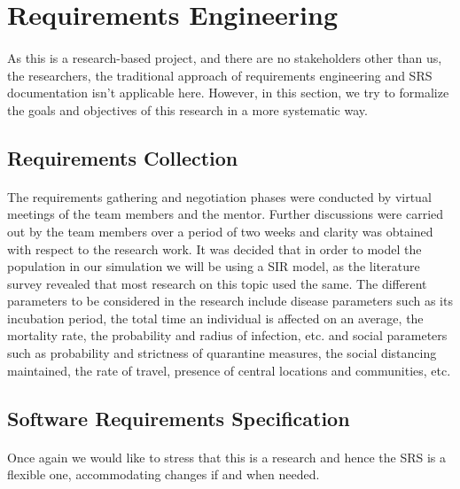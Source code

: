 \documentclass[14pt, a4paper]{extarticle}
\begin{document}
    \section{Requirements Engineering}
        \paragraph{} As this is a research-based project, and there are no stakeholders other than us, the researchers, the traditional approach of requirements engineering and SRS documentation isn't applicable here. However, in this section, we try to formalize the goals and objectives of this research in a more systematic way.
        
        \subsection{Requirements Collection}
            \paragraph{} The requirements gathering and negotiation phases were conducted by virtual meetings of the team members and the mentor. Further discussions were carried out by the team members over a period of two weeks and clarity was obtained with respect to the research work. It was decided that in order to model the population in our simulation we will be using a SIR model, as the literature survey revealed that most research on this topic used the same. The different parameters to be considered in the research include disease parameters such as its incubation period, the total time an individual is affected on an average, the mortality rate, the probability and radius of infection, etc. and social parameters such as probability and strictness of quarantine measures, the social distancing maintained, the rate of travel, presence of central locations and communities, etc.
            
        \subsection{Software Requirements Specification}
            \paragraph{} Once again we would like to stress that this is a research and hence the SRS is a flexible one, accommodating changes if and when needed.
            
\end{document}
